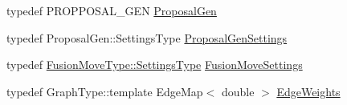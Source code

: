 \begin{DoxyCompactItemize}
\item 
typedef P\+R\+O\+P\+P\+O\+S\+A\+L\+\_\+\+G\+EN \hyperlink{classnifty_1_1graph_1_1opt_1_1multicut_1_1FusionMoveBased_a20f18fce0e2b081cf3123491ffb2884b}{Proposal\+Gen}
\item 
typedef Proposal\+Gen\+::\+Settings\+Type \hyperlink{classnifty_1_1graph_1_1opt_1_1multicut_1_1FusionMoveBased_aaf3d9d7ef4284238e4585cc245dd305d}{Proposal\+Gen\+Settings}
\item 
typedef \hyperlink{structnifty_1_1graph_1_1opt_1_1multicut_1_1FusionMove_1_1SettingsType}{Fusion\+Move\+Type\+::\+Settings\+Type} \hyperlink{classnifty_1_1graph_1_1opt_1_1multicut_1_1FusionMoveBased_aaa8805d6f7e74144a52a6b35b1e40fcc}{Fusion\+Move\+Settings}
\item 
typedef Graph\+Type\+::template Edge\+Map$<$ double $>$ \hyperlink{classnifty_1_1graph_1_1opt_1_1multicut_1_1FusionMoveBased_a5bc1f4904c2506a452119f800c570f21}{Edge\+Weights}
\end{DoxyCompactItemize}

